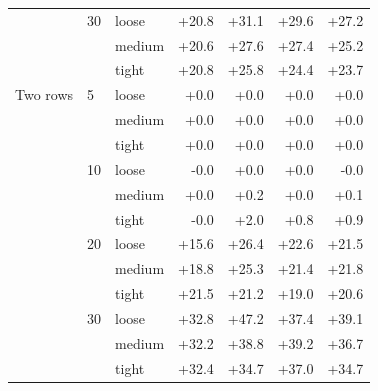 \begin{table}[htbp]
\begin{tabular}{lll rrr r}
     & 30 & loose & +20.8 & +31.1 & +29.6 & +27.2 \\
     &  & medium & +20.6 & +27.6 & +27.4 & +25.2 \\
     &  & tight & +20.8 & +25.8 & +24.4 & +23.7 \\
    Two rows & 5 & loose & +0.0 & +0.0 & +0.0 & +0.0 \\
     &  & medium & +0.0 & +0.0 & +0.0 & +0.0 \\
     &  & tight & +0.0 & +0.0 & +0.0 & +0.0 \\
     & 10 & loose & -0.0 & +0.0 & +0.0 & -0.0 \\
     &  & medium & +0.0 & +0.2 & +0.0 & +0.1 \\
     &  & tight & -0.0 & +2.0 & +0.8 & +0.9 \\
     & 20 & loose & +15.6 & +26.4 & +22.6 & +21.5 \\
     &  & medium & +18.8 & +25.3 & +21.4 & +21.8 \\
     &  & tight & +21.5 & +21.2 & +19.0 & +20.6 \\
     & 30 & loose & +32.8 & +47.2 & +37.4 & +39.1 \\
     &  & medium & +32.2 & +38.8 & +39.2 & +36.7 \\
     &  & tight & +32.4 & +34.7 & +37.0 & +34.7 \\
    \bottomrule
  \end{tabular}
\end{table}
